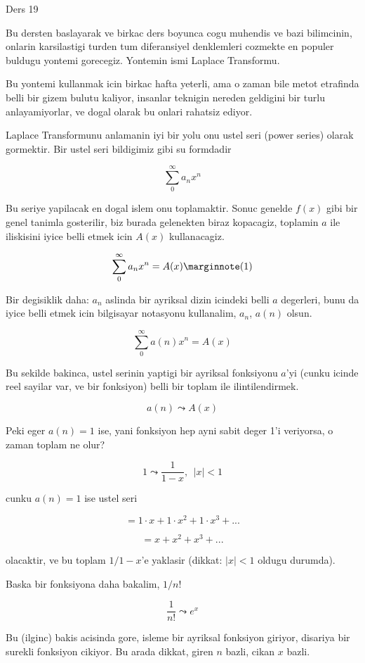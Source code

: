 \documentclass[12pt,fleqn]{article}\usepackage{../common}
\begin{document}
Ders 19 

Bu dersten baslayarak ve birkac ders boyunca cogu muhendis ve bazi
bilimcinin, onlarin karsilastigi turden tum diferansiyel denklemleri
cozmekte en populer buldugu yontemi gorecegiz. Yontemin ismi Laplace
Transformu. 

Bu yontemi kullanmak icin birkac hafta yeterli, ama o zaman bile metot
etrafinda belli bir gizem bulutu kaliyor, insanlar teknigin nereden
geldigini bir turlu anlayamiyorlar, ve dogal olarak bu onlari rahatsiz
ediyor.  

Laplace Transformunu anlamanin iyi bir yolu onu ustel seri (power series)
olarak gormektir. Bir ustel seri bildigimiz gibi su formdadir

\[ \sum_{0}^{\infty} a_n x^n \]

Bu seriye yapilacak en dogal islem onu toplamaktir. Sonuc genelde $f(x)$
gibi bir genel tanimla gosterilir, biz burada gelenekten biraz kopacagiz,
toplamin $a$ ile iliskisini iyice belli etmek icin $A(x)$ kullanacagiz. 

\[ \sum_{0}^{\infty} a_n x^n = A(x)
\mlabel{1}
\]

Bir degisiklik daha: $a_n$ aslinda bir ayriksal dizin icindeki belli $a$
degerleri, bunu da iyice belli etmek icin bilgisayar notasyonu kullanalim,
$a_n$, $a(n)$ olsun. 

\[ \sum_{0}^{\infty} a(n) x^n = A(x)\]

Bu sekilde bakinca, ustel serinin yaptigi bir ayriksal fonksiyonu $a$'yi
(cunku icinde reel sayilar var, ve bir fonksiyon) belli bir toplam ile
ilintilendirmek. 

\[ a(n) \leadsto A(x) \]

Peki eger $a(n) = 1$ ise, yani fonksiyon hep ayni sabit deger 1'i
veriyorsa, o zaman toplam ne olur? 

\[ 1 \leadsto \frac{1}{1-x}, \ \ |x|<1 \]

cunku $a(n) = 1$ ise ustel seri 

\[ = 1 \cdot x + 1 \cdot x^2 + 1 \cdot x^3 + ... \]

\[ = x + x^2 + x^3 + ... \]

olacaktir, ve bu toplam $1/1-x$'e yaklasir (dikkat: $|x|<1$ oldugu
durumda). 

Baska bir fonksiyona daha bakalim, $1 / n!$ 

\[ \frac{1}{n!} \leadsto e^x \]

Bu (ilginc) bakis acisinda gore, isleme bir ayriksal fonksiyon giriyor,
disariya bir surekli fonksiyon cikiyor. Bu arada dikkat, giren $n$ bazli, cikan $x$
bazli. 
\end{document}
